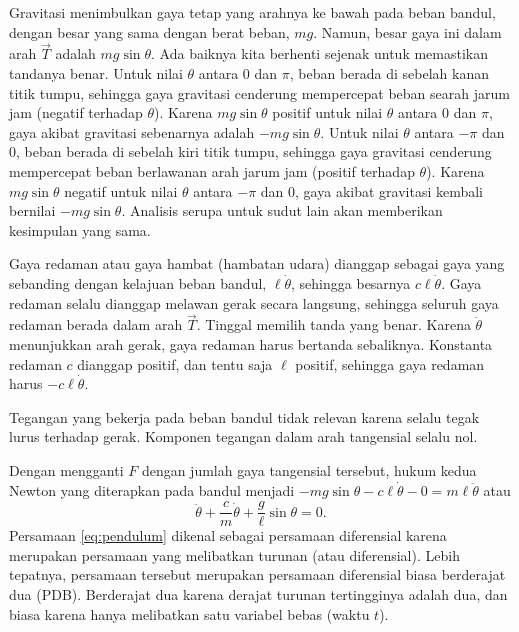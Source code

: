 Gravitasi menimbulkan gaya tetap yang arahnya
ke bawah pada beban bandul, dengan besar yang sama dengan berat beban,
$mg$. Namun, besar gaya ini dalam arah $\vec{T}$ adalah $mg\sin\theta$.
Ada baiknya kita berhenti sejenak untuk memastikan tandanya benar.
Untuk nilai $\theta$ antara 0 dan $\pi$, beban berada di sebelah
kanan titik tumpu, sehingga gaya gravitasi cenderung mempercepat beban
searah jarum jam (negatif terhadap $\theta$). Karena $mg\sin\theta$
positif untuk nilai $\theta$ antara 0 dan $\pi$, gaya akibat gravitasi
sebenarnya adalah $-mg\sin\theta$. Untuk nilai $\theta$ antara $-\pi$
dan 0, beban berada di sebelah kiri titik tumpu, sehingga gaya gravitasi
cenderung mempercepat beban berlawanan arah jarum jam (positif terhadap
$\theta$). Karena $mg\sin\theta$ negatif untuk nilai $\theta$ antara
$-\pi$ dan 0, gaya akibat gravitasi kembali bernilai $-mg\sin\theta$.
Analisis serupa untuk sudut lain akan memberikan kesimpulan yang sama.

Gaya redaman atau gaya hambat (hambatan udara)
dianggap sebagai gaya yang sebanding dengan kelajuan beban bandul,
$\ell\dot{\theta}$, sehingga besarnya $c\ell\dot{\theta}$. Gaya
redaman selalu dianggap melawan gerak secara langsung, sehingga seluruh
gaya redaman berada dalam arah $\vec{T}$. Tinggal memilih tanda yang
benar. Karena $\dot{\theta}$ menunjukkan arah gerak, gaya redaman
harus bertanda sebaliknya. Konstanta redaman $c$ dianggap positif,
dan tentu saja $\ell$ positif, sehingga gaya redaman harus $-c\ell\dot{\theta}$.

Tegangan yang bekerja pada beban bandul tidak
relevan karena selalu tegak lurus terhadap gerak. Komponen tegangan
dalam arah tangensial selalu nol.

Dengan mengganti $F$ dengan jumlah gaya tangensial tersebut, hukum
kedua Newton yang diterapkan pada bandul menjadi $-mg\sin\theta-c\ell\dot{\theta}-0=m\ell\ddot{\theta}$
atau
\begin{equation}
\ddot{\theta}+\frac{c}{m}\dot{\theta}+\frac{g}{\ell}\sin\theta=0.\label{eq:pendulum}
\end{equation}
Persamaan \ref{eq:pendulum} dikenal sebagai persamaan diferensial
karena merupakan persamaan yang melibatkan turunan (atau diferensial).
Lebih tepatnya, persamaan tersebut merupakan persamaan diferensial
biasa berderajat dua (PDB).
Berderajat dua karena derajat
turunan tertingginya adalah dua, dan biasa karena hanya melibatkan
satu variabel bebas (waktu $t$).

